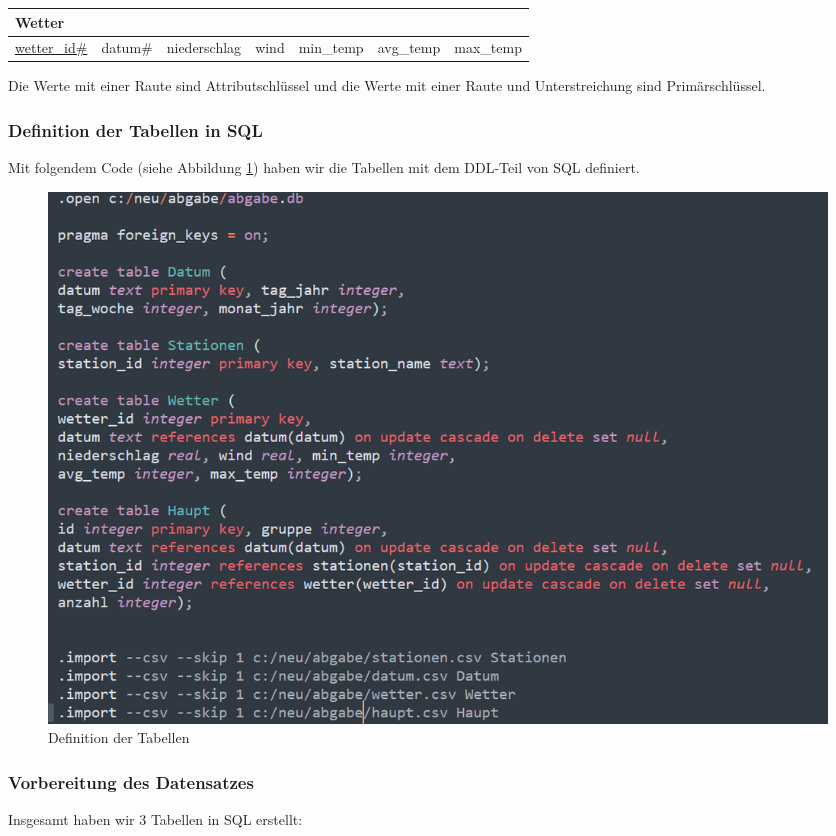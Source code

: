 \documentclass{article}
\begin{document}
\begin{center}
    \begin{tabular}{|m{}|m{}|m{}|m{}|m{}|m{}|m{}|}
    \hline
    \multicolumn{7}{|l|}{Wetter}\\
    \hline
         \underline{wetter\_id\#}& datum\# & niederschlag & wind & min\_temp & avg\_temp & max\_temp  \\
         \hline
    \end{tabular}{}
\end{center}
Die Werte mit einer Raute sind Attributschlüssel und die Werte mit einer Raute und  Unterstreichung sind Primärschlüssel.

\newpage

\subsubsection{Definition der Tabellen in SQL}

Mit folgendem Code (siehe Abbildung \ref{fig:Abb3}) haben wir die Tabellen mit dem DDL-Teil von SQL definiert.

\begin{figure}[ht]
    \centering
    \includegraphics[width= \textwidth]{Abbildung_3.png}
    \caption{Definition der Tabellen}
    \label{fig:Abb3}
\end{figure}

\subsubsection{Vorbereitung des Datensatzes}

Insgesamt haben wir 3 Tabellen in SQL \cite{sqlite} erstellt:
\end{document}
